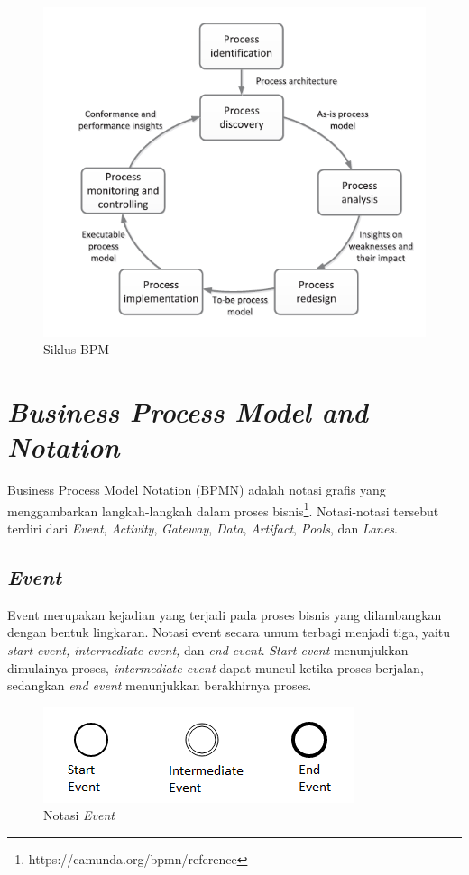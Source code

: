 \begin{figure}[H]
	\centering
	\includegraphics[scale=0.7]{Gambar/Bab-2/2-bpm-lifeCycle}
	\caption{Siklus BPM} 
	\label{siklusbpm}
\end{figure}


\section{\textit{Business Process Model and Notation}}
\label{sec:bpmn}
Business Process Model Notation (BPMN) adalah notasi grafis yang menggambarkan langkah-langkah dalam proses bisnis\footnote{https://camunda.org/bpmn/reference}. Notasi-notasi tersebut terdiri dari \textit{Event}, \textit{Activity}, \textit{Gateway}, \textit{Data}, \textit{Artifact}, \textit{Pools}, dan \textit{Lanes}.

\subsection{\textit{Event}}
\label{sec:event}
Event merupakan kejadian yang terjadi pada proses bisnis yang dilambangkan dengan bentuk lingkaran. Notasi event secara umum terbagi menjadi tiga, yaitu \textit{start event, intermediate event,} dan \textit{end event}. \textit{Start event} menunjukkan dimulainya proses, \textit{intermediate event} dapat muncul ketika proses berjalan, sedangkan \textit{end event} menunjukkan berakhirnya proses.  
\begin{figure}[H]
	\centering
	\includegraphics[scale=1]{Gambar/Bab-2/bpmn/event1}
	\caption{Notasi \textit{Event}} 
	\label{event}
\end{figure}

